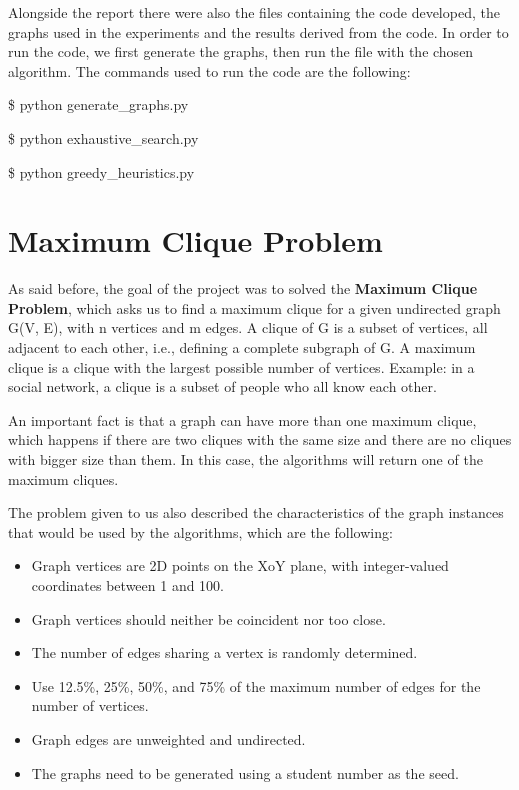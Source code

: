 \documentclass[]{revdetua}
\begin{document}
Alongside the report there were also the files containing the code developed, the graphs used in the experiments and the results derived from the code. In order to run the code, we first generate the graphs, then run the file with the chosen algorithm. The commands used to run the code are the following: \linebreak

\$ python generate\_graphs.py 

\$ python exhaustive\_search.py

\$ python greedy\_heuristics.py

\section{Maximum Clique Problem}

As said before, the goal of the project was to solved the \textbf{Maximum Clique Problem}, which asks us to find a maximum clique for a given undirected graph G(V, E), with n vertices and m edges. A clique of G is a subset of vertices, all adjacent to each other, i.e., defining a complete subgraph of G. A maximum clique is a clique with the largest possible number of vertices. Example: in a social network, a clique is a subset of people who all know each other.

An important fact is that a graph can have more than one maximum clique, which happens if there are two cliques with the same size and there are no cliques with bigger size than them. In this case, the algorithms will return one of the maximum cliques.

The problem given to us also described the characteristics of the graph instances that would be used by the algorithms, which are the following:

\begin{itemize}
\item Graph vertices are 2D points on the XoY plane, with integer-valued coordinates between 1 and 100.
\item Graph vertices should neither be coincident nor too close.
\item The number of edges sharing a vertex is randomly determined.
\item Use 12.5\%, 25\%, 50\%, and 75\% of the maximum number of edges for the number of vertices.
\item Graph edges are unweighted and undirected.
\item The graphs need to be generated using a student number as the seed.
\end{itemize}
\end{document}

